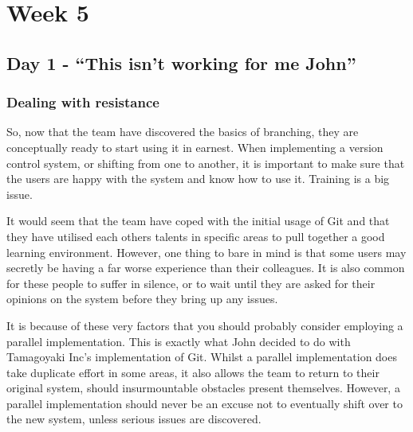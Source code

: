 \cleardoublepage
\chapter{Week 5}

\section{Day 1 - ``This isn't working for me John''}
\subsection{Dealing with resistance}

So, now that the team have discovered the basics of branching, they are conceptually ready to start using it in earnest.  When implementing a version control system, or shifting from one to another, it is important to make sure that the users are happy with the system and know how to use it.  Training is a big issue.

It would seem that the team have coped with the initial usage of Git and that they have utilised each others talents in specific areas to pull together a good learning environment.  However, one thing to bare in mind is that some users may secretly be having a far worse experience than their colleagues.  It is also common for these people to suffer in silence, or to wait until they are asked for their opinions on the system before they bring up any issues.

It is because of these very factors that you should probably consider employing a parallel implementation.  This is exactly what John decided to do with Tamagoyaki Inc's implementation of Git.  Whilst a parallel implementation does take duplicate effort in some areas, it also allows the team to return to their original system, should insurmountable obstacles present themselves.  However, a parallel implementation should never be an excuse not to eventually shift over to the new system, unless serious issues are discovered.

